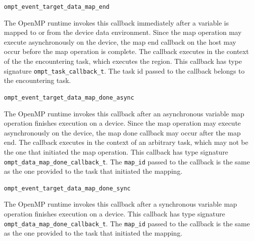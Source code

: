 \documentclass{article}
\begin{document}
\begin{description}
\item \verb|ompt_event_target_data_map_end|

  The OpenMP runtime invokes this callback immediately after a variable is mapped to or from the device data environment. Since the map operation may execute asynchronously on the device, the map end callback on the host may occur before the map operation is complete.
  The callback executes in the context of the the encountering task, which executes the region.
  This callback has type signature \verb|ompt_task_callback_t|. The task id passed to the callback belongs to the encountering task.
  
  \item \verb|ompt_event_target_data_map_done_async|

  The OpenMP runtime invokes this callback after an asynchronous variable map operation finishes execution on a device.
   Since the map operation may execute asynchronously on the device, the map done callback may occur after the map end.
  The callback executes in the context of an arbitrary task, which may not be the one that initiated the map operation.
  This callback has type signature \verb|ompt_data_map_done_callback_t|. The \verb|map_id| passed to the callback is the same as the one provided to the task that initiated the mapping.
  
\item \verb|ompt_event_target_data_map_done_sync|

  The OpenMP runtime invokes this callback after a synchronous variable map operation finishes execution on a device. This callback has type signature \verb|ompt_data_map_done_callback_t|.  The \verb|map_id| passed to the callback is the same as the one provided to the task that initiated the mapping.


% 
% 
% 


\end{description}
\end{document}
